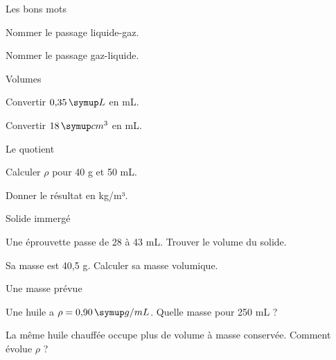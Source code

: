 \par\noindent\begin{minipage}{\linewidth}
\begin{exercice}[1]{Les bons mots}
\begin{questions}
\item Nommer le passage liquide-gaz.
\item Nommer le passage gaz-liquide.
\end{questions}
\end{exercice}
\end{minipage}
\par\noindent\begin{minipage}{\linewidth}
\begin{exercice}[1]{Volumes}
\begin{questions}
\item Convertir $0{,}35\unite L$ en mL.
\item Convertir $18\unite{cm^3}$ en mL.
\end{questions}
\end{exercice}
\end{minipage}
\par\noindent\begin{minipage}{\linewidth}
\begin{exercice}[1]{Le quotient}
\begin{questions}
\item Calculer $\rho$ pour 40 g et 50 mL.
\item Donner le résultat en kg/m³.
\end{questions}
\end{exercice}
\end{minipage}
\clearpage{}
\par\noindent\begin{minipage}{\linewidth}
\begin{exercice}[2]{Solide immergé}
\begin{questions}
\item Une éprouvette passe de 28 à 43 mL. Trouver le volume du solide.
\item Sa masse est 40,5 g. Calculer sa masse volumique.
\end{questions}
\end{exercice}
\end{minipage}
\par\noindent\begin{minipage}{\linewidth}
\begin{exercice}[2]{Une masse prévue}
\begin{questions}
\item Une huile a $\rho=0{,}90\unite{g/mL}$. Quelle masse pour 250 mL ?
\item La même huile chauffée occupe plus de volume à masse conservée. Comment évolue $\rho$ ?
\end{questions}
\end{exercice}
\end{minipage}
